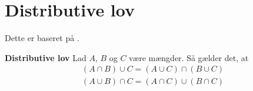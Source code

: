 \section{Distributive lov}\label{Distributive love}
Dette er baseret på \cite[s. 6]{olofsson2005probability}.

\begin{minipage}\textwidth
\begin{lem} \textbf{Distributive lov} %
\newline
Lad $A$, $B$ og $C$ være mængder. Så gælder det, at
    \begin{align*}
        (A\cap B)\cup C=(A\cup C)\cap(B\cup C)\\
        (A\cup B)\cap C=(A\cap C)\cup(B\cap C)
    \end{align*}
\end{lem}
\end{minipage}